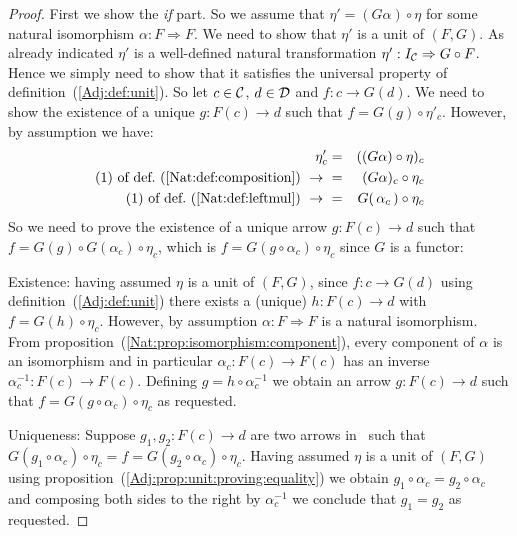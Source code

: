 \noindent
\begin{proof}
    First we show the {\em if} part. So we assume that $\eta'=(G\alpha)\circ\eta$
    for some natural isomorphism $\alpha:F\Rightarrow F$. We need to show that
    $\eta'$ is a unit of $(F,G)$. As already indicated $\eta'$ is a well-defined
    natural transformation $\eta':I_{\cal C}\Rightarrow G\circ F$. Hence we
    simply need to show that it satisfies the universal property of 
    definition~(\ref{Adj:def:unit}). So let $c\in\mbox{$\cal C$}$, $d\in\mbox{$\cal D$}$ and 
    $f:c\to G(d)$. We need to show the existence of a unique $g:F(c)\to d$
    such that $f = G(g)\circ\eta'_{c}$. However, by assumption we have:
        \begin{eqnarray*}\eta'_{c}
            &=&((G\alpha)\circ\eta)_{c}\\
            \mbox{$(1)$ of def.~(\ref{Nat:def:composition})}\ \to\ 
            &=&(G\alpha)_{c}\circ\eta_{c}\\
            \mbox{$(1)$ of def.~(\ref{Nat:def:leftmul})}\ \to\ 
            &=&G(\,\alpha_{c}\,)\circ\eta_{c}\\
        \end{eqnarray*}
    So we need to prove the existence of a unique arrow $g:F(c)\to d$
    such that $f=G(g)\circ G(\alpha_{c})\circ\eta_{c}$, which is
    $f=G(g\circ\alpha_{c})\circ\eta_{c}$ since $G$ is a functor:

    Existence: having assumed $\eta$ is a unit of $(F,G)$, since 
    $f:c\to G(d)$ using definition~(\ref{Adj:def:unit}) there exists
    a (unique) $h:F(c)\to d$ with $f = G(h)\circ\eta_{c}$.
    However, by assumption $\alpha:F\Rightarrow F$ is a natural
    isomorphism. From proposition~(\ref{Nat:prop:isomorphism:component}),
    every component of $\alpha$ is an isomorphism and in particular
    $\alpha_{c}:F(c)\to F(c)$ has an inverse $\alpha_{c}^{-1}:F(c)\to F(c)$.
    Defining $g=h\circ\alpha_{c}^{-1}$ we obtain an arrow $g:F(c)\to d$ such
    that $f=G(g\circ\alpha_{c})\circ\eta_{c}$ as requested.

    Uniqueness: Suppose $g_{1},g_{2}:F(c)\to d$ are two arrows in \Dat\ 
    such that $G(g_{1}\circ\alpha_{c})\circ\eta_{c}=f=G(g_{2}\circ\alpha_{c})
    \circ\eta_{c}$. Having assumed $\eta$ is a unit of $(F,G)$ using
    proposition~(\ref{Adj:prop:unit:proving:equality}) we obtain 
    $g_{1}\circ\alpha_{c}=g_{2}\circ\alpha_{c}$ and composing both sides
    to the right by $\alpha_{c}^{-1}$ we conclude that $g_{1}=g_{2}$
    as requested.


\end{proof}
